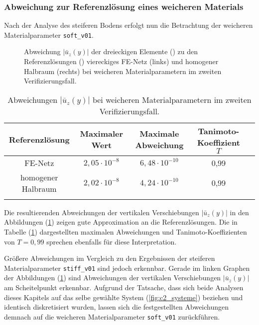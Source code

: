 \subsubsection{Abweichung zur Referenzlösung eines weicheren Materials}
Nach der Analyse des steiferen Bodens erfolgt nun die Betrachtung der weicheren Materialparameter \texttt{soft\_v01}.
\begin{figure}[H]
	\centering
	\begin{subfigure}{0.49\linewidth}
		\centering
		
	\end{subfigure}\hfill
	\begin{subfigure}{0.49\linewidth}
		\centering
		
	\end{subfigure}
	\caption{Abweichung $|\bar{u}_z(y)|$ der dreieckigen Elemente (\legThree) zu den Referenzlösungen (\legFour) viereckiges FE-Netz (links) und homogener Halbraum (rechts) bei weicheren Materialparametern im zweiten Verifizierungsfall.}
	\label{fig:c2_soft}
\end{figure}
\begin{table}[htb]
	\centering
	\normalsize
	{\renewcommand{\arraystretch}{1.15}
		\begin{tabular}{ccccc}
			\firsthline
			Referenzlösung & Maximaler Wert & Maximale Abweichung & Tanimoto-Koeffizient $T$ \\\hline
			FE-Netz & $ 2,05\cdot10^{-8}$ & $6,48\cdot10^{-10}$ & 0,99 \\
			homogener Halbraum & $2,02\cdot10^{-8}$ & $4,24\cdot10^{-10}$ & 0,99 \\\lasthline
	\end{tabular}}
	\caption{Abweichungen $|\bar{u}_z(y)|$ bei weicheren Materialparametern im zweiten Verifizierungsfall.}
	\label{tab:Fehlermessung_c2_soft}
\end{table}
Die resultierenden Abweichungen der vertikalen Verschiebungen $|\bar{u}_z(y)|$ in den Abbildungen (\ref{fig:c2_soft}) zeigen gute Approximation an die Referenzlösungen. Die in Tabelle (\ref{tab:Fehlermessung_c2_soft}) dargestellten maximalen Abweichungen und Tanimoto-Koeffizienten von $T = 0,99$ sprechen ebenfalls für diese Interpretation. 

Größere Abweichungen im Vergleich zu den Ergebnissen der steiferen Materialparameter \texttt{stiff\_v01} sind jedoch erkennbar. Gerade im linken Graphen der Abbildungen (\ref{fig:c2_soft}) sind Abweichungen der vertikalen Verschiebungen $|\bar{u}_z(y)|$ am Scheitelpunkt erkennbar.
Aufgrund der Tatsache, dass sich beide Analysen dieses Kapitels auf das selbe gewählte System (\ref{fig:c2_systeme}) beziehen und identisch diskretisiert wurden, lassen sich die festgestellten Abweichungen demnach auf die weicheren Materialparameter \texttt{soft\_v01} zurückführen.

